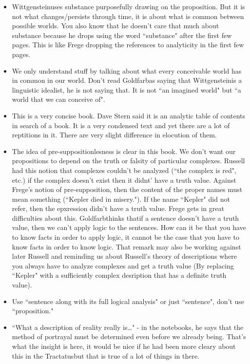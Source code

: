 \documentclass[12pt]{article}
\theoremstyle{definition}
\newcommand{\w}{Wittgenstein}
\newcommand{\T}{Tractatus}
\newcommand{\g}{Goldfarb}
\begin{document}
\begin{itemize}
    \item \w uses substance purposefully drawing on the proposition. But it is not what changes/persists through time, it is about what is common between possible worlds. You also know that he doesn't care that much about substance because he drops using the word ``substance" after the first few pages. This is like Frege dropping the references to analyticity in the first few pages.
    \item We only understand stuff by talking about what every conceivable world has in common in our world. Don't read \g as saying that \w is a linguistic idealist, he is not saying that. It is not ``an imagined world" but ``a world that we can conceive of".
    \item This is a very concise book. Dave Stern said it is an analytic table of contents in search of a book. It is a very condensed text and yet there are a lot of reptitions in it. There are very slight difference in elocution of them.
    \item The idea of pre-suppositionlesness is clear in this book. We don't want our propositions to depend on the truth or falsity of particular complexes. Russell had this notion that complexes couldn't be analyzed (``the complex is red", etc.) if the complex doesn't exist then it didnt' have a truth value. Against Frege's notion of pre-supposition, then the content of the proper names must mean something (``Kepler died in misery."). If the name ``Kepler" did not refer, then the epxression didn't have a truth value. Frege gets in great difficulties about this. \g thinks thatif a sentence doesn't have a truth value, then we can't apply logic to the sentences. How can it be that you have to know facts in order to apply logic, it cannot be the case that you have to know facts in order to know logic. That remark may also be working against later Russell and reminding us about Russell's theory of descriptions where you always have to analyze complexes and get a truth value (By replacing ``Kepler" with a sufficiently complex desription that has a definite truth value).
    \item Use ``sentence along with its full logical analysis" or just ``sentence", don't use ``proposition."
    \item ``What a description of reality really is\ldots" - in the notebooks, he says that the method of portrayal must be determined even before we already being. That's what the insight is here, it would be nice if he had been more cleary about this in the \T but that is true of a lot of things in there.

\end{itemize}
\end{document}
